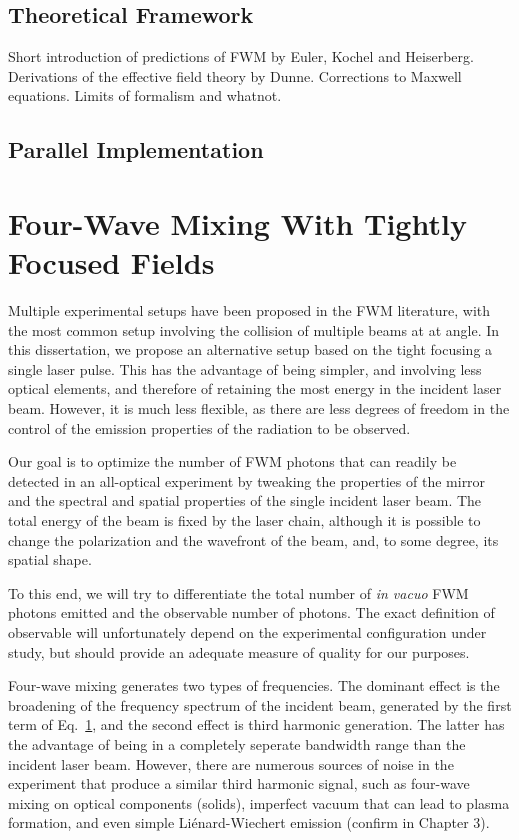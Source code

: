 \documentclass[11pt,SymmetricalJury]{inrsthesis/inrsthesis}
\begin{document}
\subsection{Theoretical Framework}

Short introduction of predictions of FWM by Euler, Kochel and Heiserberg.
Derivations of the effective field theory by Dunne. Corrections to Maxwell
equations. Limits of formalism and whatnot.


\subsection{Parallel Implementation}

\section{Four-Wave Mixing With Tightly Focused Fields}

Multiple experimental setups have been proposed in the FWM literature, with the
most common setup involving the collision of multiple beams at at angle. In this
dissertation, we propose an alternative setup based on the tight focusing a
single laser pulse. This has the advantage of being simpler, and involving less
optical elements, and therefore of retaining the most energy in the incident
laser beam. However, it is much less flexible, as there are less degrees of
freedom in the control of the emission properties of the radiation to be
observed.

Our goal is to optimize the number of FWM photons that can readily be detected
in an all-optical experiment by tweaking the properties of the mirror and the
spectral and spatial properties of the single incident laser beam. The total
energy of the beam is fixed by the laser chain, although it is possible to
change the polarization and the wavefront of the beam, and, to some degree, its
spatial shape.

To this end, we will try to differentiate the total number of \textit{in vacuo}
FWM photons emitted and the observable number of photons. The exact definition
of observable will unfortunately depend on the experimental configuration
under study, but should provide an adequate measure of quality for our
purposes.

Four-wave mixing generates two types of frequencies. The dominant effect
is the broadening of the frequency spectrum of the incident beam, generated
by the first term of Eq.~\ref{}, and the second effect is third harmonic generation.
The latter has the advantage of being in a completely seperate bandwidth range
than the incident laser beam. However, there are numerous sources of noise in the
experiment that produce a similar third harmonic signal, such as four-wave mixing
on optical components (solids), imperfect vacuum that can lead to plasma formation,
and even simple Liénard-Wiechert emission (confirm in Chapter 3).
\end{document}
